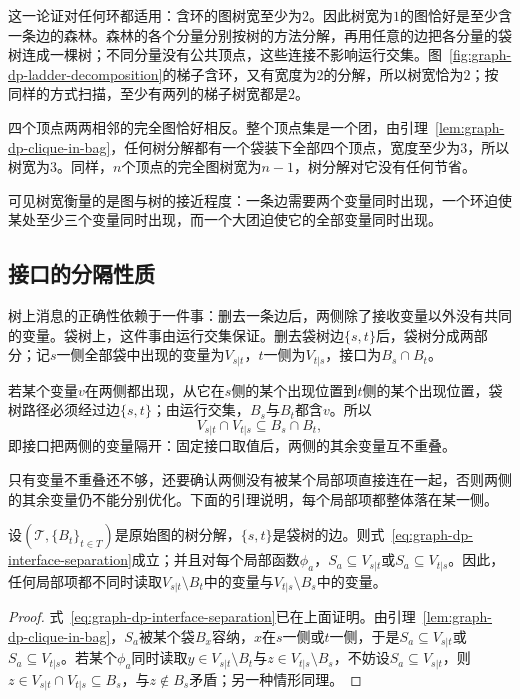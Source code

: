 这一论证对任何环都适用：含环的图树宽至少为$2$。因此树宽为$1$的图恰好是至少含一条边的森林。森林的各个分量分别按树的方法分解，再用任意的边把各分量的袋树连成一棵树；不同分量没有公共顶点，这些连接不影响运行交集。图~\ref{fig:graph-dp-ladder-decomposition}的梯子含环，又有宽度为$2$的分解，所以树宽恰为$2$；按同样的方式扫描，至少有两列的梯子树宽都是$2$。

四个顶点两两相邻的完全图恰好相反。整个顶点集是一个团，由引理~\ref{lem:graph-dp-clique-in-bag}，任何树分解都有一个袋装下全部四个顶点，宽度至少为$3$，所以树宽为$3$。同样，$n$个顶点的完全图树宽为$n-1$，树分解对它没有任何节省。

可见树宽衡量的是图与树的接近程度：一条边需要两个变量同时出现，一个环迫使某处至少三个变量同时出现，而一个大团迫使它的全部变量同时出现。

\subsection{接口的分隔性质}
\label{sec:graph-dp-interface-separation}

树上消息的正确性依赖于一件事：删去一条边后，两侧除了接收变量以外没有共同的变量。袋树上，这件事由运行交集保证。删去袋树边$\{s,t\}$后，袋树分成两部分；记$s$一侧全部袋中出现的变量为$V_{s|t}$，$t$一侧为$V_{t|s}$，接口为$B_s\cap B_t$。

若某个变量$v$在两侧都出现，从它在$s$侧的某个出现位置到$t$侧的某个出现位置，袋树路径必须经过边$\{s,t\}$；由运行交集，$B_s$与$B_t$都含$v$。所以
\begin{equation}
V_{s|t}\cap V_{t|s}\subseteq B_s\cap B_t,
\label{eq:graph-dp-interface-separation}
\end{equation}
即接口把两侧的变量隔开：固定接口取值后，两侧的其余变量互不重叠。

只有变量不重叠还不够，还要确认两侧没有被某个局部项直接连在一起，否则两侧的其余变量仍不能分别优化。下面的引理说明，每个局部项都整体落在某一侧。

\begin{lemma}[接口分隔两侧]
\label{lem:graph-dp-interface-separation}
设$(\mathcal T,\{B_t\}_{t\in T})$是原始图的树分解，$\{s,t\}$是袋树的边。则式~\eqref{eq:graph-dp-interface-separation}成立；并且对每个局部函数$\phi_a$，$S_a\subseteq V_{s|t}$或$S_a\subseteq V_{t|s}$。因此，任何局部项都不同时读取$V_{s|t}\setminus B_t$中的变量与$V_{t|s}\setminus B_s$中的变量。
\end{lemma}

\begin{proof}
式~\eqref{eq:graph-dp-interface-separation}已在上面证明。由引理~\ref{lem:graph-dp-clique-in-bag}，$S_a$被某个袋$B_x$容纳，$x$在$s$一侧或$t$一侧，于是$S_a\subseteq V_{s|t}$或$S_a\subseteq V_{t|s}$。若某个$\phi_a$同时读取$y\in V_{s|t}\setminus B_t$与$z\in V_{t|s}\setminus B_s$，不妨设$S_a\subseteq V_{s|t}$，则$z\in V_{s|t}\cap V_{t|s}\subseteq B_s$，与$z\notin B_s$矛盾；另一种情形同理。
\end{proof}

